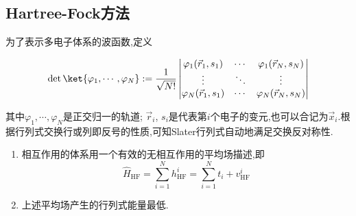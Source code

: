 \documentclass{ctexbook}
\begin{document}
\subsection{Hartree-Fock方法}
为了表示多电子体系的波函数,定义
\begin{definition}[Slater行列式]
    \[\det\ket{\varphi_1,\cdots,\varphi_N}:=\dfrac{1}{\sqrt{N!}}\begin{vmatrix}
        \varphi_1(\vec{r}_1,s_1)&\cdots&\varphi_1(\vec{r}_N,s_N)\\
        \vdots&\ddots&\vdots\\
        \varphi_N(\vec{r}_1,s_1)&\cdots&\varphi_N(\vec{r}_N,s_N)
    \end{vmatrix}\]
\end{definition}
其中$\varphi_1,\cdots,\varphi_N$是正交归一的轨道; $\vec{r}_i$, $s_i$是代表第$i$个电子的变元,也可以合记为$\vec{x}_i$.根据行列式交换行或列即反号的性质,可知Slater行列式自动地满足交换反对称性.
\begin{theorem}
    \begin{enumerate}[label=\tbf{\alph*.}]
        \item 相互作用的体系用一个有效的无相互作用的平均场描述,即
        \[\hat{H}_{\text{HF}}=\sum_{i=1}^{N}h_{\text{HF}}^i=\sum_{i=1}^{N}t_i+v_{\text{HF}}^{i}\]
        \item 上述平均场产生的行列式能量最低.
    \end{enumerate}
\end{theorem}
\end{document}

